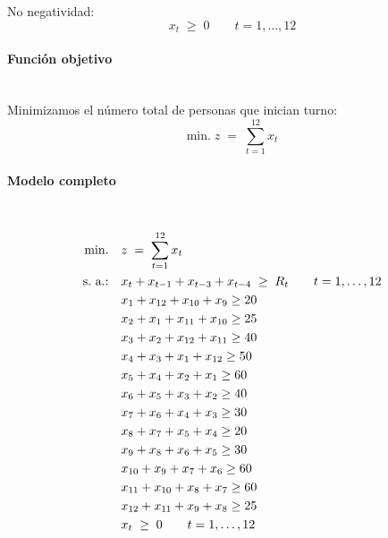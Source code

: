 \noindent No negatividad:
\begin{equation}
    x_t \;\ge\; 0 \qquad t=1,\dots,12
\end{equation}

\paragraph{Función objetivo}\mbox{}\\
Minimizamos el número total de personas que inician turno:
\begin{equation}
\mbox{min.}\; z \;=\; \sum_{t=1}^{12} x_t
\end{equation}

\paragraph{Modelo completo}\mbox{}\\
\begin{align}
\mbox{min.}\quad & z \;=\; \sum_{t=1}^{12} x_t \notag \\
\mbox{s.\ a.:}\quad 
& x_t + x_{t-1} + x_{t-3} + x_{t-4} \;\ge\; R_t \qquad t=1,\dots,12 \notag \\
& x_1  + x_{12} + x_{10} + x_{9}   \ge 20 \notag \\
& x_2  + x_{1}  + x_{11} + x_{10}  \ge 25 \notag \\
& x_3  + x_{2}  + x_{12} + x_{11}  \ge 40 \notag \\
& x_4  + x_{3}  + x_{1}  + x_{12}  \ge 50 \notag \\
& x_5  + x_{4}  + x_{2}  + x_{1}   \ge 60 \notag \\
& x_6  + x_{5}  + x_{3}  + x_{2}   \ge 40 \notag \\
& x_7  + x_{6}  + x_{4}  + x_{3}   \ge 30 \notag \\
& x_8  + x_{7}  + x_{5}  + x_{4}   \ge 20 \notag \\
& x_9  + x_{8}  + x_{6}  + x_{5}   \ge 30 \notag \\
& x_{10}+ x_{9}  + x_{7}  + x_{6}  \ge 60 \notag \\
& x_{11}+ x_{10} + x_{8}  + x_{7}  \ge 60 \notag \\
& x_{12}+ x_{11} + x_{9}  + x_{8}  \ge 25 \notag \\
& x_t \;\ge\; 0 \qquad t=1,\dots,12 \notag
\end{align}



